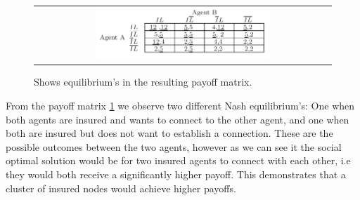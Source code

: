 \begin{figure}[h]
\centering
\begin{tabular}{@{}c@{}}
\includegraphics[width=0.6\textwidth]{../Figures/gameTheoryModel1WithNumbers.png}
\end{tabular}
\caption{\label{fig:GTmodel1} Shows equilibrium's in the resulting payoff matrix.}
\end{figure}

From the payoff matrix \ref{fig:GTmodel1} we observe two different Nash equilibrium's: One when both agents are insured and wants to connect to the other agent, and one when both are insured but does not want to establish a connection. These are the possible outcomes between the two agents, however as we can see it the social optimal solution would be for two insured agents to connect with each other, i.e they would both receive a significantly higher payoff. This demonstrates that a cluster of insured nodes would achieve higher payoffs.  
